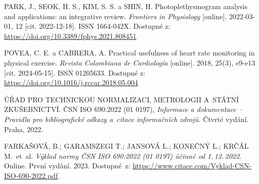 \begin{thebibliography}{99}
		PARK, J., SEOK, H. S., KIM, S. S. a SHIN, H.
		Photoplethysmogram analysis and applications: an integrative review.
		\emph{Frontiers in Physiology} [online].
		2022-03-01, 12 [cit. 2022-12-18].
		ISSN 1664-042X.
		Dostupné z: \url{https://doi.org/10.3389/fphys.2021.808451}

		POVEA, C. E. a CABRERA, A.
		Practical usefulness of heart rate monitoring in physical exercise.
		\emph{Revista Colombiana de Cardiología} [online].
		2018, 25(3), e9-e13 [cit. 2024-05-15].
		ISSN 01205633.
		Dostupné z: \url{https://doi.org/10.1016/j.rccar.2018.05.004}


		ÚŘAD PRO TECHNICKOU NORMALIZACI, METROLOGII A~STÁTNÍ ZKUŠEBNICTVÍ.
		ČSN ISO 690:2022 (01 0197), \emph{Informace a dokumentace -- Pravidla pro bibliografické odkazy a~citace informačních zdrojů.}
		Čtvrté vydání. Praha, 2022.

		FARKAŠOVÁ, B.; GARAMSZEGI T.; JANSOVÁ L.; KONEČNÝ L.; KRČÁL M.\ et~al.
		\emph{Výklad normy ČSN ISO 690:2022 (01 0197) účinné od 1.\,12.\,2022}.
		Online. První vydání. 2023.
		Dostupné~z:
		\url{https://www.citace.com/Vyklad-CSN-ISO-690-2022.pdf}.

\end{thebibliography}


%
%
%
